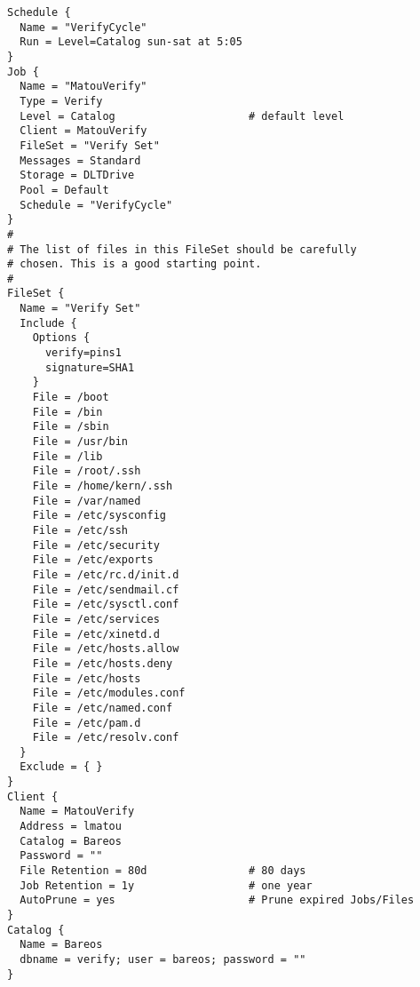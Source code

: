 \footnotesize
\begin{verbatim}
Schedule {
  Name = "VerifyCycle"
  Run = Level=Catalog sun-sat at 5:05
}
Job {
  Name = "MatouVerify"
  Type = Verify
  Level = Catalog                     # default level
  Client = MatouVerify
  FileSet = "Verify Set"
  Messages = Standard
  Storage = DLTDrive
  Pool = Default
  Schedule = "VerifyCycle"
}
#
# The list of files in this FileSet should be carefully
# chosen. This is a good starting point.
#
FileSet {
  Name = "Verify Set"
  Include {
    Options {
      verify=pins1
      signature=SHA1
    }
    File = /boot
    File = /bin
    File = /sbin
    File = /usr/bin
    File = /lib
    File = /root/.ssh
    File = /home/kern/.ssh
    File = /var/named
    File = /etc/sysconfig
    File = /etc/ssh
    File = /etc/security
    File = /etc/exports
    File = /etc/rc.d/init.d
    File = /etc/sendmail.cf
    File = /etc/sysctl.conf
    File = /etc/services
    File = /etc/xinetd.d
    File = /etc/hosts.allow
    File = /etc/hosts.deny
    File = /etc/hosts
    File = /etc/modules.conf
    File = /etc/named.conf
    File = /etc/pam.d
    File = /etc/resolv.conf
  }
  Exclude = { }
}
Client {
  Name = MatouVerify
  Address = lmatou
  Catalog = Bareos
  Password = ""
  File Retention = 80d                # 80 days
  Job Retention = 1y                  # one year
  AutoPrune = yes                     # Prune expired Jobs/Files
}
Catalog {
  Name = Bareos
  dbname = verify; user = bareos; password = ""
}
\end{verbatim}
\normalsize
